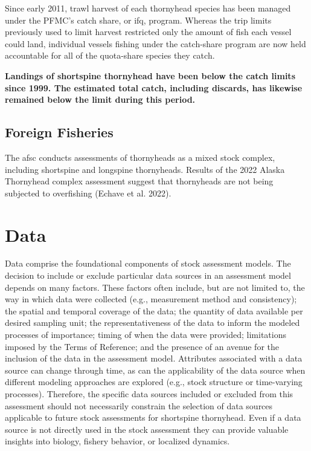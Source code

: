\documentclass[11pt,
  english,
  letterpaper,
]{article}
\begin{document}
Since early 2011, trawl harvest of each thornyhead species has been managed under the PFMC's catch share, or \gls{ifq}, program. Whereas the trip limits previously used to limit harvest restricted only the amount of fish each vessel could land, individual vessels fishing under the catch-share program are now held accountable for all of the quota-share species they catch.

\textbf{Landings of shortspine thornyhead have been below the catch limits since 1999. The estimated total catch, including discards, has likewise remained below the limit during this period.}

\hypertarget{foreign-fisheries}{%
\subsection{Foreign Fisheries}\label{foreign-fisheries}}

The \gls{afsc} conducts assessments of thornyheads as a mixed stock complex, including shortspine and longspine thornyheads. Results of the 2022 Alaska Thornyhead complex assessment suggest that thornyheads are not being subjected to overfishing (Echave et al. 2022).

\hypertarget{data}{%
\section{Data}\label{data}}

Data comprise the foundational components of stock assessment models. The decision to include or exclude particular data sources in an assessment model depends on many factors. These factors often include, but are not limited to, the way in which data were collected (e.g., measurement method and consistency); the spatial and temporal coverage of the data; the quantity of data available per desired sampling unit; the representativeness of the data to inform the modeled processes of importance; timing of when the data were provided; limitations imposed by the Terms of Reference; and the presence of an avenue for the inclusion of the data in the assessment model. Attributes associated with a data source can change through time, as can the applicability of the data source when different modeling approaches are explored (e.g., stock structure or time-varying processes). Therefore, the specific data sources included or excluded from this assessment should not necessarily constrain the selection of data sources applicable to future stock assessments for shortspine thornyhead. Even if a data source is not directly used in the stock assessment they can provide valuable insights into biology, fishery behavior, or localized dynamics.
\end{document}
